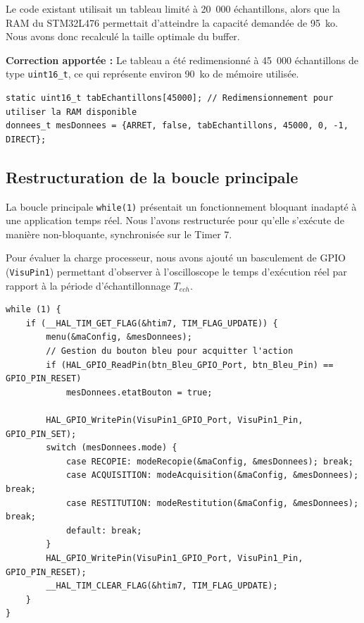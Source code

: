 \documentclass{article}
\begin{document}
Le code existant utilisait un tableau limité à 20~000 échantillons, alors que la RAM du STM32L476 permettait d'atteindre la capacité demandée de 95~ko. Nous avons donc recalculé la taille optimale du buffer.

\textbf{Correction apportée :} Le tableau a été redimensionné à 45~000 échantillons de type \texttt{uint16\_t}, ce qui représente environ 90~ko de mémoire utilisée.

\begin{lstlisting}[caption=Modification de la taille du buffer (main.c)]
static uint16_t tabEchantillons[45000]; // Redimensionnement pour utiliser la RAM disponible
donnees_t mesDonnees = {ARRET, false, tabEchantillons, 45000, 0, -1, DIRECT};
\end{lstlisting}

\subsection{Restructuration de la boucle principale}

La boucle principale \texttt{while(1)} présentait un fonctionnement bloquant inadapté à une application temps réel. Nous l'avons restructurée pour qu'elle s'exécute de manière non-bloquante, synchronisée sur le Timer 7.

Pour évaluer la charge processeur, nous avons ajouté un basculement de GPIO (\texttt{VisuPin1}) permettant d'observer à l'oscilloscope le temps d'exécution réel par rapport à la période d'échantillonnage $T_{ech}$.

\begin{lstlisting}[caption=Boucle principale cadencée par le Timer 7]
while (1) {
    if (__HAL_TIM_GET_FLAG(&htim7, TIM_FLAG_UPDATE)) {
        menu(&maConfig, &mesDonnees);
        // Gestion du bouton bleu pour acquitter l'action
        if (HAL_GPIO_ReadPin(btn_Bleu_GPIO_Port, btn_Bleu_Pin) == GPIO_PIN_RESET)
            mesDonnees.etatBouton = true;

        HAL_GPIO_WritePin(VisuPin1_GPIO_Port, VisuPin1_Pin, GPIO_PIN_SET);
        switch (mesDonnees.mode) {
            case RECOPIE: modeRecopie(&maConfig, &mesDonnees); break;
            case ACQUISITION: modeAcquisition(&maConfig, &mesDonnees); break;
            case RESTITUTION: modeRestitution(&maConfig, &mesDonnees); break;
            default: break;
        }
        HAL_GPIO_WritePin(VisuPin1_GPIO_Port, VisuPin1_Pin, GPIO_PIN_RESET);
        __HAL_TIM_CLEAR_FLAG(&htim7, TIM_FLAG_UPDATE);
    }
}
\end{lstlisting}
\end{document}
